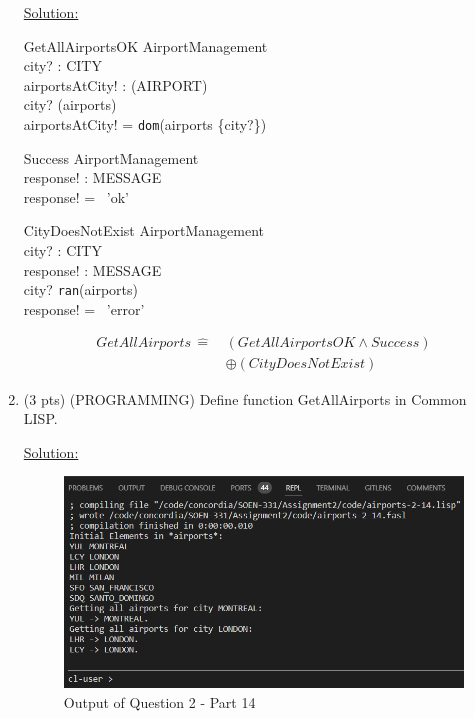 \documentclass[12pt]{article}
\begin{document}
\begin{spacing}{1.5}
\begin{enumerate}
        \underline{Solution:}
        \begin{schema}{GetAllAirportsOK}
            \Xi AirportManagement \\
            city? : CITY \\
            airportsAtCity! : (AIRPORT) \\
            \where
            city? \in {}(airports) \\
            airportsAtCity! = \texttt{dom}(airports \rres \{city?\})
        \end{schema}

        \begin{schema}{Success}
            \Xi AirportManagement \\
            response! : MESSAGE \\
            \where
            response! = \, 'ok' \\
        \end{schema}

        \begin{schema}{CityDoesNotExist}
            \Xi AirportManagement \\
            city? : CITY \\
            response! : MESSAGE \\
            \where
            city? \notin \texttt{ran}(airports) \\
            response! = \, 'error' \\
        \end{schema}
        \begin{align*}
            GetAllAirports \, \hat{=} \, &(GetAllAirportsOK \land Success) \\
            &\oplus (CityDoesNotExist)
        \end{align*}
        \newpage
        \item (3 pts) (PROGRAMMING) Define function GetAllAirports in Common LISP.
        
        \underline{Solution:}
        

        \begin{figure}[htp]
            \centering
            \includegraphics[width=1\textwidth]{static/airports-2-14.PNG}
            \caption{Output of Question 2 - Part 14}
        \end{figure}
    \end{enumerate}
    \newpage

\end{spacing}
\end{document}
